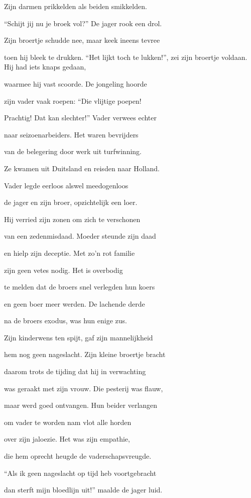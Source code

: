 Zijn darmen prikkelden
als beiden smikkelden.

“Schijt jij nu je broek vol?”
De jager rook een drol.

Zijn broertje schudde nee,
maar keek ineens tevree

toen hij bleek te drukken.
“Het lijkt toch te lukken!”,
zei zijn broertje voldaan.
Hij had iets knaps gedaan,

waarmee hij vast scoorde.
De jongeling hoorde

zijn vader vaak roepen:
“Die vlijtige poepen!

Prachtig! Dat kan slechter!”
Vader verwees echter

naar seizoenarbeiders.
Het waren bevrijders

van de belegering
door werk uit turfwinning.

Ze kwamen uit Duitsland
en reisden naar Holland.

Vader legde eerloos
alswel meedogenloos

de jager en zijn broer,
opzichtelijk een loer.

Hij verried zijn zonen
om zich te verschonen

van een zedenmisdaad.
Moeder steunde zijn daad

en hielp zijn deceptie.
Met zo’n rot familie

zijn geen vetes nodig.
Het is overbodig

te melden dat de broers
snel verlegden hun koers

en geen boer meer werden.
De lachende derde

na de broers exodus,
was hun enige zus.

Zijn kinderwens ten spijt,
gaf zijn mannelijkheid

hem nog geen nageslacht.
Zijn kleine broertje bracht

daarom trots de tijding
dat hij in verwachting

was geraakt met zijn vrouw.
Die pesterij was flauw,

maar werd goed ontvangen.
Hun beider verlangen

om vader te worden
nam vlot alle horden

over zijn jaloezie.
Het was zijn empathie,

die hem oprecht heugde
de vaderschapsvreugde.

“Als ik geen nageslacht
op tijd heb voortgebracht

dan sterft mijn bloedlijn uit!”
maalde de jager luid.

